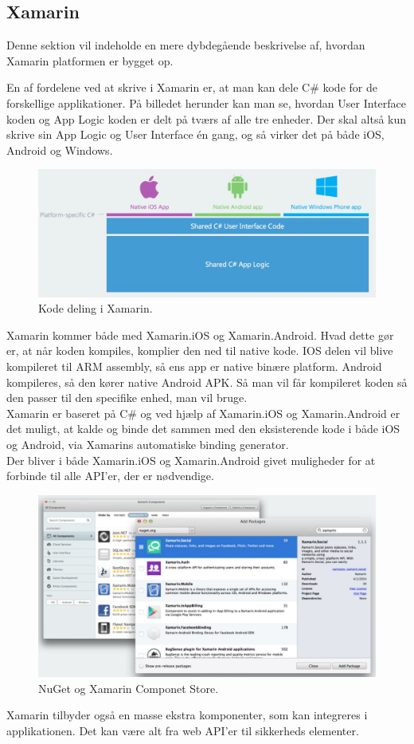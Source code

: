 \subsection{Xamarin}
Denne sektion vil indeholde en mere dybdegående beskrivelse af, hvordan Xamarin platformen er bygget op.

En af fordelene ved at skrive i Xamarin er, at man kan dele C\# kode for de forskellige applikationer.
På billedet herunder kan man se, hvordan User Interface koden og App Logic koden er delt på tværs af alle tre enheder. Der skal altså kun skrive sin App Logic og User Interface én gang, og så virker det på både iOS, Android og Windows.
\begin{figure}[H]
	\centering
	\includegraphics[width=1\linewidth]{Applikation/XarmarinShare.JPG}
	\caption{Kode deling i Xamarin.\cite{Xarmain}}
	\label{fig:CodeShare}
\end{figure}

\clearpage

Xamarin kommer både med Xamarin.iOS og Xamarin.Android. Hvad dette gør er, at når koden kompiles, komplier den ned til native kode. IOS delen vil blive kompileret til ARM assembly, så ens app er native binære platform. Android kompileres, så den kører native Android APK. Så man vil får kompileret koden så den passer til den specifike enhed, man vil bruge. \\
Xamarin er baseret på C\# og ved hjælp af Xamarin.iOS og Xamarin.Android er det muligt, at kalde og binde det sammen med den eksisterende kode i både iOS og Android, via Xamarins automatiske binding generator. \\
Der bliver i både Xamarin.iOS og Xamarin.Android givet muligheder for at forbinde til alle API'er, der er nødvendige. \\

\begin{figure}[H]
	\centering
	\includegraphics[width=0.7\linewidth]{Applikation/NuGet.JPG}
	\caption{NuGet og Xamarin Componet Store.\cite{Xarmain}}
	\label{fig:NuGet}
\end{figure}
Xamarin tilbyder også en masse ekstra komponenter, som kan integreres i applikationen. Det kan være alt fra web API'er til sikkerheds elementer.

\clearpage